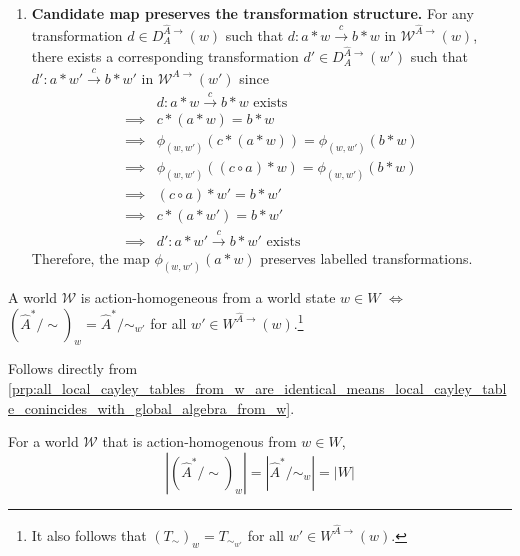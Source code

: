 \begin{proofE}
\begin{enumerate}[(1)]
\begin{enumerate}
        \item \textbf{Candidate map preserves the transformation structure.}
        For any transformation $d \in D_{A}^{\hat{A}\to}(w)$ such that $d: a \ast w \xrightarrow{c} b \ast w$ in $\mathscr{W}^{\hat{A}\to}(w)$, there exists a corresponding transformation $d' \in D_{A}^{\hat{A}\to}(w')$ such that $d': a \ast w' \xrightarrow{c} b \ast w'$ in $\mathscr{W}^{\hat{A}\to}(w')$ since
        \begin{align}
            & d: a \ast w \xrightarrow{c} b \ast w \text{ exists} \\
            \implies & c \ast (a \ast w) = b \ast w \\
            \implies & \phi_{(w, w')}(c \ast (a \ast w)) = \phi_{(w, w')}(b \ast w) \\
            \implies & \phi_{(w, w')}((c \circ a) \ast w) = \phi_{(w, w')}(b \ast w) \\
            \implies & (c \circ a) \ast w' = b \ast w' \\
            \implies & c \ast (a \ast w') = b \ast w' \\
            \implies & d': a \ast w' \xrightarrow{c} b \ast w' \text{ exists}
        \end{align}
        Therefore, the map $\phi_{(w, w')}(a \ast w)$ preserves labelled transformations.
    \end{enumerate}
\end{enumerate}
\end{proofE}

\begin{corollaryE}
    A world $\mathscr{W}$ is action-homogeneous from a world state $w \in W$ $\iff$ $(\hat{A}^{*}/\sim)_{w} = \hat{A}^{*}/\sim_{w'}$ for all $w' \in W^{\hat{A}\to}(w)$.\footnote{
    It also follows that $(T_{\sim})_{w} = T_{\sim_{w'}}$ for all $w' \in W^{\hat{A}\to}(w)$.
    }
\end{corollaryE}
\begin{proofE}
    Follows directly from \cref{prp:all_local_cayley_tables_from_w_are_identical_means_local_cayley_table_conincides_with_global_algebra_from_w}.
\end{proofE}

\begin{corollaryE}
    For a world $\mathscr{W}$ that is action-homogenous from $w \in W$,
    \begin{equation}
        |(\hat{A}^{*}/\sim)_{w}| = |\hat{A}^{*}/\sim_{w}| = |W|
    \end{equation}
\end{corollaryE}



